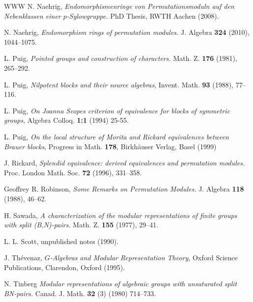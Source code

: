 \documentclass{amsart}
\theoremstyle{plain}\newtheorem{Theorem}{Theorem}[section]
\theoremstyle{plain}\newtheorem{Conjecture}[Theorem]{Conjecture}
\theoremstyle{plain}\newtheorem{Corollary}[Theorem]{Corollary}
\theoremstyle{plain}\newtheorem{Lemma}[Theorem]{Lemma}
\theoremstyle{plain}\newtheorem{Proposition}[Theorem]{Proposition}
\theoremstyle{definition}\newtheorem{Definition}[Theorem]{Definition}
\theoremstyle{definition}\newtheorem{Example}[Theorem]{Example}
\theoremstyle{definition}\newtheorem{Examples}[Theorem]{Examples}
\theoremstyle{definition}\newtheorem{Exercise}[Theorem]{Exercise}
\theoremstyle{definition}\newtheorem{Notation}[Theorem]{Notation}
\theoremstyle{definition}\newtheorem{Remark}[Theorem]{Remark}
\theoremstyle{definition}\newtheorem{Remarks}[Theorem]{Remarks}
\theoremstyle{plain}\newtheorem{Statement}[Theorem]{}
\begin{document}
\begin{thebibliography}{WWW}
 N. Naehrig, {\em  Endomorphismenringe von 
Permutationsmoduln auf den Nebenklassen einer $p$-Sylowgruppe.} 
PhD Thesis, RWTH Aachen (2008). 

 N. Naehrig, {\em Endomorphism rings of permutation modules.}
J. Algebra {\bf 324} (2010), 1044--1075.

 L. Puig, {\em Pointed groups and construction of
characters.} Math. Z. {\bf 176} (1981), 265--292.

 L. Puig, {\em Nilpotent blocks and their 
source  algebras}, Invent. Math. {\bf 93}  (1988), 77--116.

  L. Puig, {\em On Joanna Scopes criterion of equivalence for blocks of symmetric groups}, 
Algebra Colloq. {\bf 1:1} (1994) 25-55.


 L. Puig, {\em On the local structure of Morita 
and Rickard equivalences between Brauer blocks}, Progress in
Math. {\bf 178}, Birkh\"auser Verlag, Basel (1999) 

 J. Rickard, {\em Splendid equivalence: derived equivalences
and permutation modules.} Proc. London Math. Soc. {\bf 72} (1996), 331--358.

 Geoffrey R. Robinson, {\em Some Remarks on Permutation
Modules.} J. Algebra {\bf 118} (1988), 46--62.

 H. Sawada, {\em A characterization of the modular 
representations of finite groups with split (B,N)-pairs.} 
Math. Z. {\bf 155} (1977), 29--41.

 L. L. Scott, unpublished notes (1990).

 J. Th\'evenaz, {\em $G$-Algebras and Modular 
Representation Theory}, Oxford Science Publications, Clarendon, 
Oxford (1995).

 N. Tinberg {\em Modular representations of algebraic  groups 
with unsaturated split BN-pairs.} Canad. J. Math. {\bf 32}  (3) (1980) 714--733.


\end{thebibliography}
\end{document}
